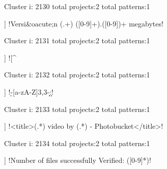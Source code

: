 Cluster i: 2130
total projects:2
total patterns:1
\begin{multicols}{1}
\begin{description}[noitemsep,topsep=0pt]
\item [[2] ] \cverb!Versi&oacute;n (.+) ([0-9]+).([0-9])+ megabytes!
\end{description}
\end{multicols}







Cluster i: 2131
total projects:2
total patterns:1
\begin{multicols}{1}
\begin{description}[noitemsep,topsep=0pt]
\item [[2] ] \cverb![^%
\end{description}
\end{multicols}







Cluster i: 2132
total projects:2
total patterns:1
\begin{multicols}{1}
\begin{description}[noitemsep,topsep=0pt]
\item [[2] ] \cverb!\d\d-[a-zA-Z]{3,3}-\d\d\d\d \d\d:\d\d!
\end{description}
\end{multicols}







Cluster i: 2133
total projects:2
total patterns:1
\begin{multicols}{1}
\begin{description}[noitemsep,topsep=0pt]
\item [[2] ] \cverb!<title>(.*) video by (.*) - Photobucket</title>!
\end{description}
\end{multicols}







Cluster i: 2134
total projects:2
total patterns:1
\begin{multicols}{1}
\begin{description}[noitemsep,topsep=0pt]
\item [[2] ] \cverb!Number of files successfully Verified: ([0-9]*)!
\end{description}
\end{multicols}







